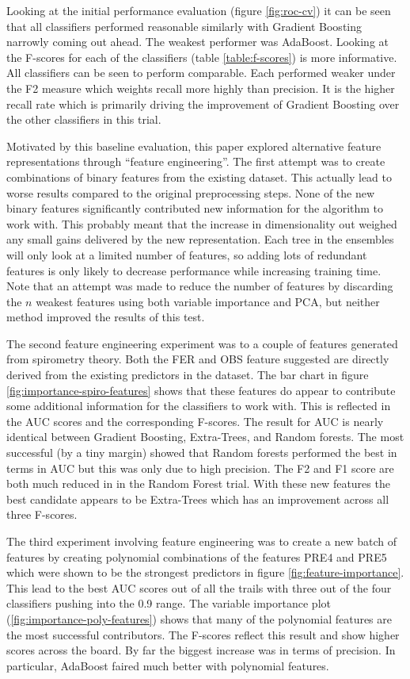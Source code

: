\documentclass[journal]{IEEEtran}
\begin{document}
Looking at the initial performance evaluation (figure \ref{fig:roc-cv}) it can be seen that all classifiers performed reasonable similarly with Gradient Boosting narrowly coming out ahead. The weakest performer was AdaBoost. Looking at the F-scores for each of the classifiers (table \ref{table:f-scores}) is more informative. All classifiers can be seen to perform comparable. Each performed weaker under the F2 measure which weights recall more highly than precision. It is the higher recall rate which is primarily driving the improvement of Gradient Boosting over the other classifiers in this trial.

Motivated by this baseline evaluation, this paper explored alternative feature representations through ``feature engineering''. The first attempt was to create combinations of binary features from the existing dataset. This actually lead to worse results compared to the original preprocessing steps. None of the new binary features significantly contributed new information for the algorithm to work with. This probably meant that the increase in dimensionality out weighed any small gains delivered by the new representation. Each tree in the ensembles will only look at a limited number of features, so adding lots of redundant features is only likely to decrease performance while increasing training time. Note that an attempt was made to reduce the number of features by discarding the $n$ weakest features using both variable importance and PCA, but neither method improved the results of this test.

The second feature engineering experiment was to a couple of features generated from spirometry theory. Both the FER and OBS feature suggested are directly derived from the existing predictors in the dataset. The bar chart in figure \ref{fig:importance-spiro-features} shows that these features do appear to contribute some additional information for the classifiers to work with. This is reflected in the AUC scores and the corresponding F-scores. The result for AUC is nearly identical between Gradient Boosting, Extra-Trees, and Random forests. The most successful (by a tiny margin) showed that Random forests performed the best in terms in AUC but this was only due to high precision. The F2 and F1 score are both much reduced in in the Random Forest trial. With these new features the best candidate appears to be Extra-Trees which has an improvement across all three F-scores.

The third experiment involving feature engineering was to create a new batch of features by creating polynomial combinations of the features PRE4 and PRE5 which were shown to be the strongest predictors in figure \ref{fig:feature-importance}. This lead to the best AUC scores out of all the trails with three out of the four classifiers pushing into the 0.9 range. The variable importance plot (\ref{fig:importance-poly-features}) shows that many of the polynomial features are the most successful contributors. The F-scores reflect this result and show higher scores across the board. By far the biggest increase was in terms of precision. In particular, AdaBoost faired much better with polynomial features.
\end{document}

